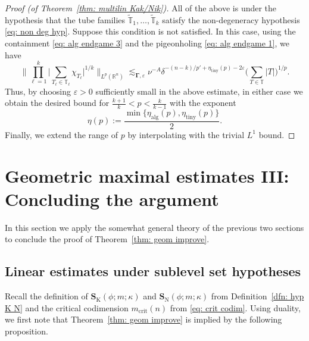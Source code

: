 \documentclass[reqno]{amsart}
\numberwithin{equation}{section}
\newcommand{\R}{\mathbb{R}}
\newcommand{\T}{\mathbb{T}}
\newcommand{\bS}{\mathbf{S}}
\newcommand{\bdGamma}{\boldsymbol{\Gamma}}
\theoremstyle{plain}
\theoremstyle{definition}
\newcommand{\tK}{\mathrm{K}}
\newcommand{\tN}{\mathrm{N}}
\newcommand{\ttiny}{\mathrm{tiny}}
\newcommand{\alg}{\mathrm{alg}}
\newcommand{\crit}{\mathrm{crit}}
\begin{document}
\begin{proof}[Proof (of Theorem~\ref{thm: multilin Kak/Nik})]
All of the above is under the hypothesis that the tube families $\widetilde{\T}_1, \dots, \widetilde{\T}_k$ satisfy the non-degeneracy hypothesis \eqref{eq: non deg hyp}. Suppose this condition is not satisfied. In this case, using the containment \eqref{eq: alg endgame 3} and the pigeonholing \eqref{eq: alg endgame 1}, we have
\begin{equation*}
\Big\|\prod_{\ell = 1}^k \big|\sum_{T_{\ell} \in \T_{\ell}} \chi_{T_{\ell}} \big|^{1/k}\Big\|_{L^p(\R^n)} \lesssim_{\bdGamma,\varepsilon} \nu^{-A} \delta^{-(n-k)/p' + \eta_{\ttiny}(p) - 2\varepsilon}  \Big(\sum_{T \in \T} |T| \Big)^{1/p}.
\end{equation*}
Thus, by choosing $\varepsilon > 0$ sufficiently small in the above estimate, in either case we obtain the desired bound for $\frac{k+1}{k} < p < \frac{k}{k-1}$ with the exponent
\begin{equation*}
    \eta(p) := \frac{\min\{\eta_{\alg}(p), \eta_{\ttiny}(p) \}}{2}.
\end{equation*}
Finally, we extend the range of $p$ by interpolating with the trivial $L^1$ bound.
\end{proof}






\section{Geometric maximal estimates III: Concluding the argument}

In this section we apply the somewhat general theory of the previous two sections to conclude the proof of Theorem~\ref{thm: geom improve}. 




\subsection{Linear estimates under sublevel set hypotheses}\label{subsec: lin under sublevel} Recall the definition of $\bS_{\tK}(\phi; m; \kappa)$ and $\bS_{\tN}(\phi; m; \kappa)$ from Definition~\ref{dfn: hyp K N} and the critical codimension $m_{\crit}(n)$ from \eqref{eq: crit codim}. Using duality, we first note that Theorem~\ref{thm: geom improve} is implied by the following proposition.  
\end{document}
